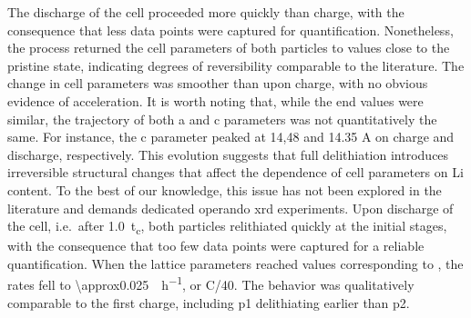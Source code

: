 \documentclass{article}
\begin{document}
The discharge of the cell proceeded more quickly than charge, with the
consequence that less data points were captured for
quantification. Nonetheless, the process returned the cell parameters
of both particles to values close to the pristine state, indicating
degrees of reversibility comparable to the
literature.\cite{robert2015} The change in cell parameters was
smoother than upon charge, with no obvious evidence of
acceleration. It is worth noting that, while the end values were
similar, the trajectory of both a and c parameters was not
quantitatively the same. For instance, the c parameter peaked at 14,48
and 14.35 A on charge and discharge, respectively. This evolution
suggests that full delithiation introduces irreversible structural
changes that affect the dependence of cell parameters on Li
content. To the best of our knowledge, this issue has not been
explored in the literature and demands dedicated operando \gls{xrd}
experiments. Upon discharge of the cell, i.e.\ after \SI{1.0}{t_c},
both particles relithiated quickly at the initial stages, with the
consequence that too few data points were captured for a reliable
quantification. When the lattice parameters reached values
corresponding to , the rates fell to
\SI{\approx0.025}{\per\hour}, or C/40. The behavior was qualitatively comparable to the first
  charge, including \gls{p1} delithiating earlier than \gls{p2}.



\end{document}
